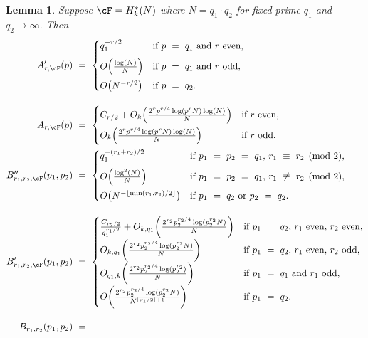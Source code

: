 \documentclass[11pt, reqno]{amsart}
\newtheorem{lemma}[theorem]{Lemma}
\theoremstyle{definition}
\theoremstyle{remark}
\numberwithin{equation}{section}
\begin{document}
\begin{lemma}\label{lem: 2 primes 1 fixed}
    Suppose $\cF = H_k^*(N)$ where $N = q_1\cdot q_2$ for fixed prime $q_1$ and $q_2 \to \infty.$ Then
    \footnotesize\begin{align*}
A'_{r,\cF}(p)\ &= \
\begin{cases}
  q_1^{-r/2} 
    & \text{if $p\ =\ q_1$ and $r$ even}, \\[6pt]
  O\!\left(\tfrac{\log(N)}{N}\right) 
    & \text{if $p\ =\ q_1$ and $r$ odd}, \\[6pt]
  O\!\left(N^{-r/2}\right) 
    & \text{if $p\ =\ q_2$}.
\end{cases} \\[10pt]
A_{r,\cF}(p)\ &= \
\begin{cases}
  C_{r/2} + O_k\!\left(\tfrac{2^r p^{r/4}\log(p^rN)\log(N)}{N}\right) 
    & \text{if $r$ even}, \\[6pt]
  O_k\!\left(\tfrac{2^r p^{r/4}\log(p^rN)\log(N)}{N}\right) 
    & \text{if $r$ odd}.
\end{cases}\\
B''_{r_1,r_2,\cF}(p_1,p_2)\ &= \
\begin{cases}
  q_1^{-(r_1+r_2)/2} 
    & \text{if $p_1\ =\ p_2\ =\ q_1$, $r_1\  \equiv \ r_2 \pmod{2}$}, \\[6pt]
  O\!\left(\tfrac{\log^2(N)}{N}\right) 
    & \text{if $p_1\ =\ p_2\ =\ q_1$, $r_1 \ \not\equiv \ r_2 \pmod{2}$}, \\[6pt]
  O\!\left(N^{-\lfloor \min(r_1,r_2)/2 \rfloor}\right) 
    & \text{if $p_1\ =\ q_2$ or $p_2\ =\ q_2$}.
\end{cases} \\[10pt]
B'_{r_1,r_2,\cF}(p_1,p_2)\ &= \
\begin{cases}
  \tfrac{C_{r_2/2}}{q_1^{r_1/2}} 
    + O_{k,q_1}\!\left(\tfrac{2^{r_2}p_2^{r_2/4}\log(p_2^{r_2}N)}{N}\right) 
    & \text{if $p_1\ =\ q_2$, $r_1$ even, $r_2$ even}, \\[6pt]
  O_{k,q_1}\!\left(\tfrac{2^{r_2}p_2^{r_2/4}\log(p_2^{r_2}N)}{N}\right) 
    & \text{if $p_1\ =\ q_2$, $r_1$ even, $r_2$ odd}, \\[6pt]
  O_{q_1,k}\!\left(\tfrac{2^{r_2}p_2^{r_2/4}\log(p_2^{r_2})}{N}\right) 
    & \text{if $p_1\ =\ q_1$ and $r_1$ odd}, \\[6pt]
  O\!\left(\tfrac{2^{r_2}p_2^{r_2/4}\log(p_2^{r_2}N)}{N^{\lfloor r_1/2\rfloor+1}}\right) 
    & \text{if $p_1\ =\ q_2$}.
\end{cases} \\[10pt]
B_{r_1,r_2}(p_1,p_2)\ &=\

\end{align*}
\end{lemma}
\end{document}
